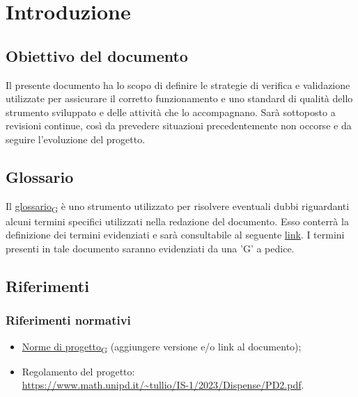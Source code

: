 \section{Introduzione}
\subsection{Obiettivo del documento}
Il presente documento ha lo scopo di definire le strategie di verifica e validazione utilizzate per assicurare il corretto funzionamento e uno standard di qualità dello strumento sviluppato e delle
attività che lo accompagnano.  Sarà sottoposto a revisioni continue, così da prevedere situazioni precedentemente non occorse e da seguire l'evoluzione del progetto.

\subsection{Glossario}
Il \href{https://7last.github.io/docs/rtb/documentazione-interna/glossario#glossario}{glossario\textsubscript{G}} è uno strumento utilizzato per risolvere eventuali dubbi riguardanti 
alcuni termini specifici utilizzati nella redazione del documento.
Esso conterrà la definizione dei termini evidenziati e sarà consultabile al seguente \href{https://7last.github.io/docs/rtb/documentazione-interna/glossario}{link}. I termini presenti in tale documento saranno evidenziati da una 'G' a pedice.

\subsection{Riferimenti}
\subsubsection{Riferimenti normativi}
\begin{itemize}
    \item \href{https://7last.github.io/docs/rtb/documentazione-interna/glossario#norme-di-progetto}{Norme di progetto\textsubscript{G}} (aggiungere versione e/o link al documento); %
    \item Regolamento del progetto:\\
		  \url{https://www.math.unipd.it/~tullio/IS-1/2023/Dispense/PD2.pdf}.
\end{itemize}

